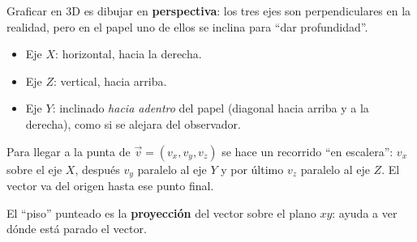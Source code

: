 \documentclass[12pt, letterpaper]{article}
\begin{document}
\begin{cuadroteoria}
  Graficar en 3D es dibujar en \textbf{perspectiva}: los tres ejes son perpendiculares en la realidad, pero en el papel uno de ellos se inclina para ``dar profundidad''.
  \begin{itemize}[leftmargin=*]
    \item Eje $X$: horizontal, hacia la derecha.
    \item Eje $Z$: vertical, hacia arriba.
    \item Eje $Y$: inclinado \emph{hacia adentro} del papel (diagonal hacia arriba y a la derecha), como si se alejara del observador.
  \end{itemize}
  Para llegar a la punta de $\vec{v} = (v_x, v_y, v_z)$ se hace un recorrido ``en escalera'': $v_x$ sobre el eje $X$, después $v_y$ paralelo al eje $Y$ y por último $v_z$ paralelo al eje $Z$. El vector va del origen hasta ese punto final.
  \begin{center}
  \end{center}
  El ``piso'' punteado es la \textbf{proyección} del vector sobre el plano $xy$: ayuda a ver dónde está parado el vector.
\end{cuadroteoria}
\end{document}
